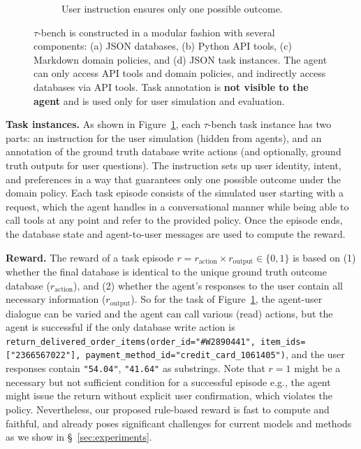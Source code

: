 \documentclass{article}
\newcommand{\benchmark}{$\tau$-bench}
\begin{document}
\begin{figure}[t]
\begin{subfigure}[t]{0.56\textwidth}
\caption{User instruction ensures only one possible outcome.}
\label{fig:task}
\end{subfigure}
\caption{\benchmark{} is constructed in a modular fashion with several components: (a) JSON databases, (b) Python API tools, (c) Markdown domain policies, and (d) JSON task instances. The agent can only access API tools and domain policies, and indirectly access databases via API tools. Task annotation is \textbf{not visible to the agent} and is used only for user simulation and evaluation. }
\label{fig:examples}
\vspace{-10pt}
\end{figure}



\textbf{Task instances.} As shown in Figure~\ref{fig:task}, each \benchmark{} task instance has two parts: an instruction for the user simulation (hidden from agents), and an annotation of the ground truth database write actions (and optionally, ground truth outputs for user questions). The instruction sets up user identity, intent, and preferences in a way that guarantees only one possible outcome under the domain policy. Each task episode consists of the simulated user starting with a request, which the agent handles in a conversational manner while being able to call tools at any point and refer to the provided policy. Once the episode ends, the database state and agent-to-user messages are used to compute the reward.


\textbf{Reward.} The reward of a task episode $r = r_\text{action} \times r_\text{output} \in \{0, 1\}$ is based on (1) whether the final database is identical to the unique ground truth outcome database ($r_\text{action}$), and (2) whether the agent's responses to the user contain all necessary information ($r_\text{output}$). So for the task of Figure~\ref{fig:task}, the agent-user dialogue can be varied and the agent can call various (read) actions, but the agent is successful if the only database write action is \texttt{return\_delivered\_order\_items(order\_id="\#W2890441", item\_ids=["2366567022"], payment\_method\_id="credit\_card\_1061405")}, and the user responses contain \texttt{"54.04"}, \texttt{"41.64"} as substrings. Note that $r=1$ might be a necessary but not sufficient condition for a successful episode e.g., the agent might issue the return without explicit user confirmation, which violates the policy. Nevertheless, our proposed rule-based reward is fast to compute and faithful, and already poses significant challenges for current models and methods as we show in \S~\ref{sec:experiments}.
\end{document}
